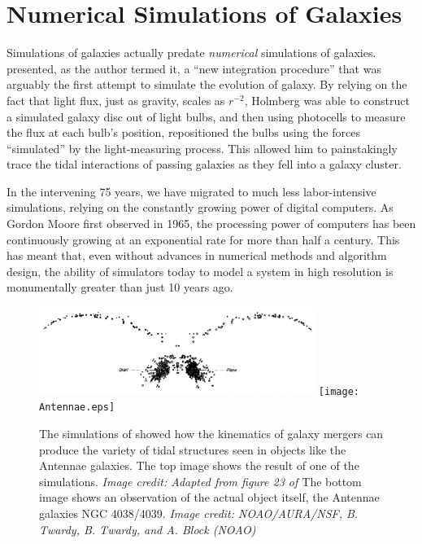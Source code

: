 \section{Numerical Simulations of Galaxies}
Simulations of galaxies actually predate {\it numerical} simulations of
galaxies.  \citet{Holmberg1941} presented, as the author termed it, a ``new
integration procedure'' that was arguably the first attempt to simulate the
evolution of galaxy.  By relying on the fact that light flux, just as gravity,
scales as $r^{-2}$, Holmberg was able to construct a simulated galaxy disc out
of light bulbs, and then using photocells to measure the flux at each bulb's
position, repositioned the bulbs using the forces ``simulated'' by the
light-measuring process.  This allowed him to painstakingly trace the tidal
interactions of passing galaxies as they fell into a galaxy cluster.

In the intervening 75 years, we have migrated to much less labor-intensive
simulations, relying on the constantly growing power of digital computers.  As
Gordon Moore first observed in 1965, the processing power of computers has been
continuously growing at an exponential rate for more than half a century.  This
has meant that, even without advances in numerical methods and algorithm design,
the ability of simulators today to model a system in high resolution is
monumentally greater than just 10 years ago.  

\begin{figure}
    \includegraphics[width=0.8\textwidth]{Toomre.eps}
    \texttt{[image: Antennae.eps]}
    \caption[Early simulation of Antennae Galaxies]{The simulations of
    \citet{Toomre1972} showed how the kinematics of galaxy mergers can produce
    the variety of tidal structures seen in objects like the Antennae galaxies.
    The top image shows the result of one of the \citet{Toomre1972} simulations.
    \textit{Image credit: Adapted from figure 23 of \citet{Toomre1972}}
    The bottom image shows an observation of the actual object itself, the
    Antennae galaxies NGC 4038/4039. \textit{Image credit: NOAO/AURA/NSF, B.
    Twardy, B. Twardy, and A. Block (NOAO)}}
\end{figure}

